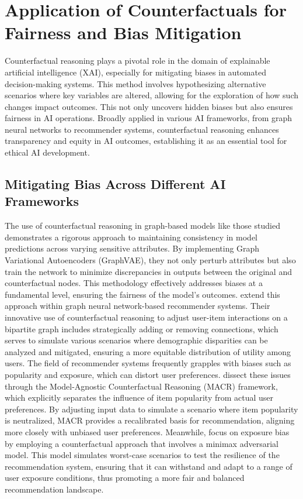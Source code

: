 \section{Application of Counterfactuals for Fairness and Bias Mitigation}

Counterfactual reasoning plays a pivotal role in the domain of explainable
artificial intelligence (XAI), especially for mitigating biases in automated decision-making
systems. This method involves hypothesizing alternative scenarios where key
variables are altered, allowing for the exploration of how such changes impact outcomes.
This not only uncovers hidden biases but also ensures fairness in AI operations.
Broadly applied in various AI frameworks, from graph neural networks to
recommender systems, counterfactual reasoning enhances transparency and equity in
AI outcomes, establishing it as an essential tool for ethical AI development.

\subsection{Mitigating Bias Across Different AI Frameworks}

The use of counterfactual reasoning in graph-based models like those studied \textcite{guo_towards_2023} demonstrates a rigorous approach to maintaining consistency in
model predictions across varying sensitive attributes. By implementing Graph Variational
Autoencoders (GraphVAE), they not only perturb attributes but also train the
network to minimize discrepancies in outputs between the original and
counterfactual nodes. This methodology effectively addresses biases at a fundamental
level, ensuring the fairness of the model's outcomes. \textcite{medda_gnnuers_2024} extend
this approach within graph neural network-based recommender systems. Their innovative
use of counterfactual reasoning to adjust user-item interactions on a bipartite graph
includes strategically adding or removing connections, which serves to simulate
various scenarios where demographic disparities can be analyzed and mitigated, ensuring
a more equitable distribution of utility among users. The field of recommender
systems frequently grapples with biases such as popularity and exposure, which can
distort user preferences. \textcite{wei_model-agnostic_2021} dissect these issues through the Model-Agnostic
Counterfactual Reasoning (MACR) framework, which explicitly separates the
influence of item popularity from actual user preferences. By adjusting input data
to simulate a scenario where item popularity is neutralized, MACR provides a
recalibrated basis for recommendation, aligning more closely with unbiased user preferences.
Meanwhile, \textcite{xu_adversarial_2020} focus on exposure bias by employing a counterfactual
approach that involves a minimax adversarial model. This model simulates worst-case
scenarios to test the resilience of the recommendation system, ensuring that it
can withstand and adapt to a range of user exposure conditions, thus promoting a
more fair and balanced recommendation landscape.


